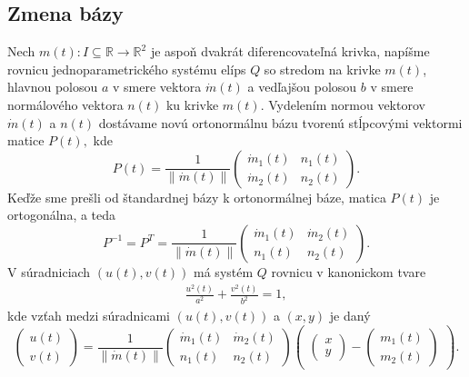 \subsection{Zmena bázy}
Nech $m(t) \colon  I \subseteq \mathbb{R} \rightarrow \mathbb{R}^2$ je aspoň dvakrát diferencovateľná krivka, napíšme rovnicu jednoparametrického systému elíps $Q$ so stredom na krivke $m(t)$, hlavnou polosou $a$ v smere vektora $\dot{m}(t)$ a vedľajšou polosou $b$ v smere normálového vektora $n(t)$ ku krivke $m(t)$. Vydelením normou vektorov $\dot{m}(t)$ a $n(t)$ dostávame novú ortonormálnu bázu tvorenú stĺpcovými vektormi matice $P(t),$ kde
$$
P(t) = \frac{1}{ \| \dot{m}(t) \|} \left(\begin{matrix}
   \dot{m}_1(t) & n_1(t) \\
   \dot{m}_2(t) & n_2(t)
\end{matrix} \right).
$$
Keďže sme prešli od štandardnej bázy k ortonormálnej báze, matica $P(t)$ je ortogonálna, a teda
$$
P^{-1} = P^{T} = \frac{1}{ \| \dot{m}(t) \|} \left(\begin{matrix}
  \dot{m}_1(t) & \dot{m}_2(t) \\
    n_1(t) & n_2(t)
\end{matrix}\right).
$$
V súradniciach $(u(t), v(t))$ má systém $Q$ rovnicu v kanonickom tvare 
\begin{align*}
\frac{u^2(t)}{a^2} + \frac{v^2(t)}{b^2} = 1,
\end{align*}
kde vzťah medzi súradnicami $(u(t), v(t))$ a $(x,y)$ je daný
$$
\left(\begin{matrix}
u(t) \\
v(t)
\end{matrix}\right) = \frac{1}{ \| \dot{m}(t) \|}
\left(\begin{matrix}
  \dot{m}_1(t) & \dot{m}_2(t) \\
    n_1(t) & n_2(t)
\end{matrix}\right)
\left(\begin{matrix} \left(\begin{matrix} x \\ y \end{matrix}\right) - \left(\begin{matrix} m_1(t) \\ m_2(t) \end{matrix}\right) \end{matrix}\right).
$$
